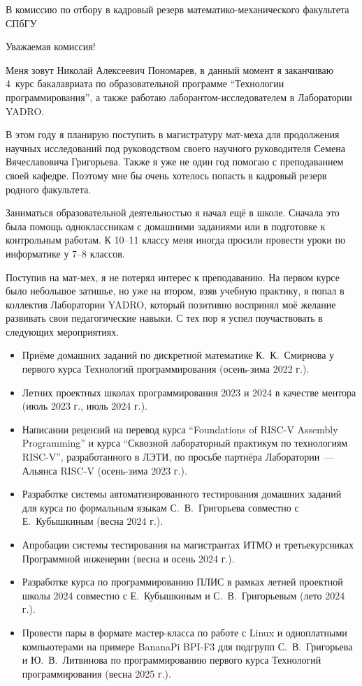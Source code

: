 \documentclass[foldmarks=false, enlargefirstpage=true,
    firstfoot=false, fromphone, fromemail, version=last]{scrlttr2}
\begin{document}
\begin{letter}{В комиссию по отбору в кадровый резерв математико-механического факультета СПбГУ}
    \opening{Уважаемая комиссия!}
    Меня зовут Николай Алексеевич Пономарев, в данный момент я заканчиваю 4~курс бакалавриата по образовательной программе \enquote{Технологии программирования}, а также работаю лаборантом-исследователем в Лаборатории YADRO.

    В этом году я планирую поступить в магистратуру мат-меха для продолжения научных исследований под руководством своего научного руководителя Семена Вячеславовича Григорьева.
    Также я уже не один год помогаю с преподаванием своей кафедре.
    Поэтому мне бы очень хотелось попасть в кадровый резерв родного факультета.

    Заниматься образовательной деятельностью я начал ещё в школе.
    Сначала это была помощь одноклассникам с домашними заданиями или в подготовке к контрольным работам.
    К 10--11 классу меня иногда просили провести уроки по информатике у 7--8 классов.

    Поступив на мат-мех, я не потерял интерес к преподаванию.
    На первом курсе было небольшое затишье, но уже на втором, взяв учебную практику, я попал в коллектив Лаборатории YADRO, который позитивно воспринял моё желание развивать свои педагогические навыки.
    С тех пор я успел поучаствовать в следующих мероприятиях.
    \begin{itemize}
        \item Приёме домашних заданий по дискретной математике К.~К.~Смирнова у первого курса Технологий программирования (осень-зима 2022 г.).
        \item Летних проектных школах программирования 2023 и 2024 в качестве ментора (июль 2023 г., июль 2024 г.).
        \item Написании рецензий на перевод курса \enquote{Foundations of RISC-V Assembly Programming} и курса \enquote{Сквозной лабораторный практикум по технологиям RISC-V}, разработанного в ЛЭТИ, по просьбе партнёра Лаборатории~--- Альянса RISC-V (осень-зима 2023 г.).
        \item Разработке системы автоматизированного тестирования домашних заданий для курса по формальным языкам С.~В.~Григорьева совместно с Е.~Кубышкиным (весна 2024 г.).
        \item Апробации системы тестирования на магистрантах ИТМО и третьекурсниках Программной инженерии (весна и осень 2024 г.).
        \item Разработке курса по программированию ПЛИС в рамках летней проектной школы 2024 совместно с Е.~Кубышкиным и С.~В.~Григорьевым (лето 2024 г.).
        \item Провести пары в формате мастер-класса по работе с Linux и одноплатными компьютерами на примере BananaPi BPI-F3 для подгрупп С.~В.~Григорьева и Ю.~В.~Литвинова по программированию первого курса Технологий программирования (весна 2025 г.).
    \end{itemize}


\end{letter}
\end{document}
